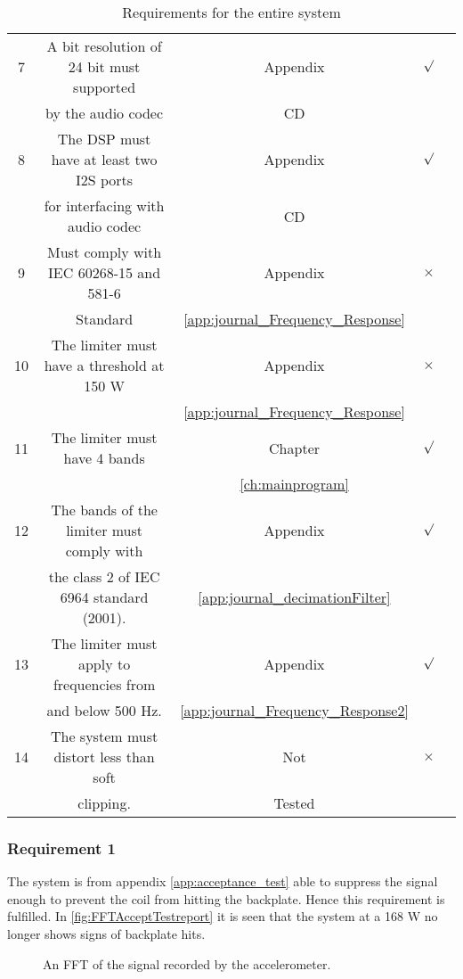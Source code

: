 \begin{table}[H]
\begin{tabular}{|c|c|c|c|c|}
7			&  A bit resolution of 24 bit must supported 	& Appendix								&	$\surd$			\\ 
			&  by the audio codec			 	 	 		&	CD					 				&					\\ \hline
%
8			& The DSP must have at least two I2S ports 		& Appendix								&	$\surd$			\\ 
			& for interfacing with audio codec  			& 	CD		 					 		&					\\ \hline
%
9			& Must comply with IEC 60268-15 and 581-6		& Appendix								&	$\times$		\\ 
			& Standard								  	 	& \ref{app:journal_Frequency_Response}	&					\\ \hline
%
10			& The limiter must have a threshold at 150 W 	& Appendix								&	$\times$		\\ 
			& 										        & \ref{app:journal_Frequency_Response}	&					\\ \hline

11			& The limiter must have 4 bands 				& Chapter								&	$\surd$			\\ 
			& 												& \ref{ch:mainprogram}			 		&					\\ \hline

12			& The bands of the limiter  must comply with 	& Appendix								&	$\surd$			\\ 
			& the class 2 of IEC 6964 standard (2001).		& \ref{app:journal_decimationFilter}	&					\\ \hline
%
13			& The limiter must apply to frequencies from	& Appendix								&	$\surd$			\\ 
			& and below 500 Hz. 						 	& \ref{app:journal_Frequency_Response2}	&					\\ \hline
%
14			& The system must distort less than soft  		& Not								&	$\times$		\\ 
			& clipping.										& Tested	&					\\ \hline								
\end{tabular}	
\caption{Requirements for the entire system}
\label{table:acceptancetest}
\end{table}

\subsubsection*{Requirement 1}

The system is from appendix \ref{app:acceptance_test} able to suppress the signal enough to prevent the coil from hitting the backplate. Hence this requirement is fulfilled. In \autoref{fig:FFTAcceptTestreport} it is seen that the system at a 168 W no longer shows signs of backplate hits.
\begin{figure}[H]
	\centering
	
	\caption{An FFT of the signal recorded by the accelerometer.}
	\label{fig:FFTAcceptTestreport}
\end{figure}

